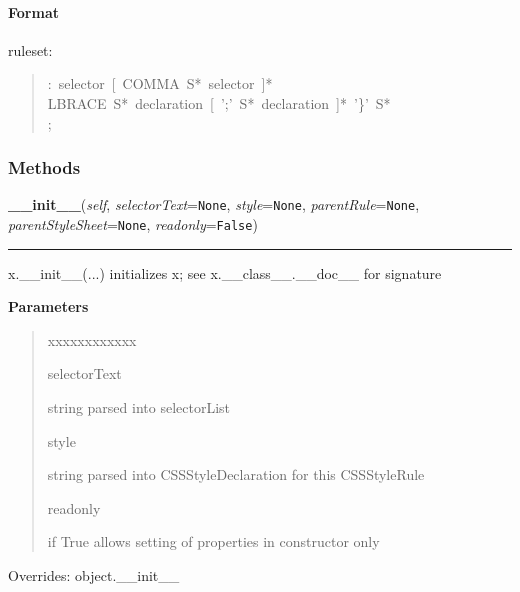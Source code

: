 
\hypertarget{format}{}
\paragraph*{Format}
\label{format}

ruleset:
\begin{quote}{\ttfamily \raggedright \noindent
:~selector~{[}~COMMA~S*~selector~{]}*~\\
LBRACE~S*~declaration~{[}~';'~S*~declaration~{]}*~'{\}}'~S*~\\
;
}\end{quote}


  \subsubsection{Methods}

    \vspace{0.5ex}

\hspace{.8\funcindent}\begin{boxedminipage}{\funcwidth}

    \raggedright \textbf{\_\_init\_\_}(\textit{self}, \textit{selectorText}={\tt None}, \textit{style}={\tt None}, \textit{parentRule}={\tt None}, \textit{parentStyleSheet}={\tt None}, \textit{readonly}={\tt False})

    \vspace{-1.5ex}

    \rule{\textwidth}{0.5\fboxrule}
\setlength{\parskip}{2ex}
    x.\_\_init\_\_(...) initializes x; see x.\_\_class\_\_.\_\_doc\_\_ for 
    signature

\setlength{\parskip}{1ex}
      \textbf{Parameters}
      \vspace{-1ex}

      \begin{quote}
        \begin{Ventry}{xxxxxxxxxxxx}

          \item[selectorText]


string parsed into selectorList
          \item[style]


string parsed into CSSStyleDeclaration for this CSSStyleRule
          \item[readonly]


if True allows setting of properties in constructor only
        \end{Ventry}

      \end{quote}

      Overrides: object.\_\_init\_\_

    \end{boxedminipage}

